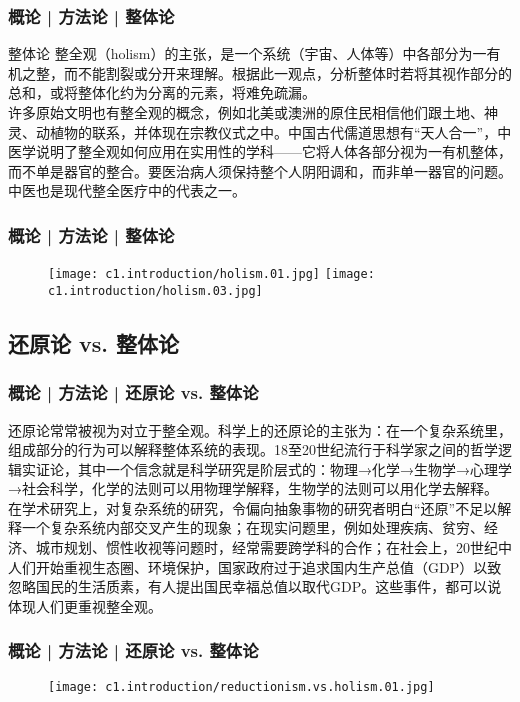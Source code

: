 \begin{frame}
  \frametitle{概论 | 方法论 | 整体论}
  \begin{block}{整体论}
整全观（holism）的主张，是一个系统（宇宙、人体等）中各部分为一有机之整，而不能割裂或分开来理解。根据此一观点，分析整体时若将其视作部分的总和，或将整体化约为分离的元素，将难免疏漏。\\
\vspace{1em}
许多原始文明也有整全观的概念，例如北美或澳洲的原住民相信他们跟土地、神灵、动植物的联系，并体现在宗教仪式之中。中国古代儒道思想有“天人合一”，中医学说明了整全观如何应用在实用性的学科——它将人体各部分视为一有机整体，而不单是器官的整合。要医治病人须保持整个人阴阳调和，而非单一器官的问题。中医也是现代整全医疗中的代表之一。
  \end{block}
\end{frame}

\begin{frame}
  \frametitle{概论 | 方法论 | 整体论}
  \begin{figure}
    \centering
    \texttt{[image: c1.introduction/holism.01.jpg]}\quad
    \texttt{[image: c1.introduction/holism.03.jpg]}
  \end{figure}
\end{frame}

\subsection{还原论 vs. 整体论}
\begin{frame}
  \frametitle{概论 | 方法论 | 还原论 vs. 整体论}
还原论常常被视为对立于整全观。科学上的还原论的主张为：在一个复杂系统里，组成部分的行为可以解释整体系统的表现。18至20世纪流行于科学家之间的哲学逻辑实证论，其中一个信念就是科学研究是阶层式的：物理→化学→生物学→心理学→社会科学，化学的法则可以用物理学解释，生物学的法则可以用化学去解释。\\
\vspace{1em}
在学术研究上，对复杂系统的研究，令偏向抽象事物的研究者明白“还原”不足以解释一个复杂系统内部交叉产生的现象；在现实问题里，例如处理疾病、贫穷、经济、城市规划、惯性收视等问题时，经常需要跨学科的合作；在社会上，20世纪中人们开始重视生态圈、环境保护，国家政府过于追求国内生产总值（GDP）以致忽略国民的生活质素，有人提出国民幸福总值以取代GDP。这些事件，都可以说体现人们更重视整全观。
\end{frame}

\begin{frame}
  \frametitle{概论 | 方法论 | 还原论 vs. 整体论}
  \begin{figure}
    \centering
    \texttt{[image: c1.introduction/reductionism.vs.holism.01.jpg]}
  \end{figure}
\end{frame}

